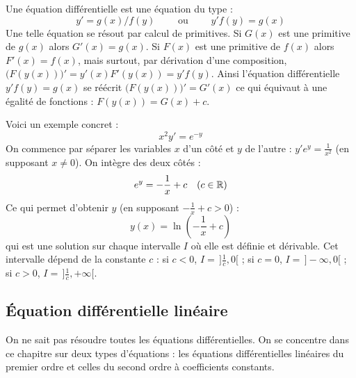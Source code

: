 \documentclass[class=report,crop=false]{standalone}
\begin{document}
\begin{exemple}
Une équation différentielle 
est une équation
du type :
$$y'=g(x)/f(y) \qquad \text{ ou } \qquad y'f(y)=g(x)$$
Une telle équation se résout par calcul de primitives.
Si $G(x)$ est une primitive de $g(x)$ alors $G'(x)=g(x)$.
Si $F(x)$ est une primitive de $f(x)$ alors
$F'(x)=f(x)$, mais surtout, par dérivation d'une composition,
$\big(F(y(x))\big)' = y'(x) F'(y(x)) = y' f(y)$.
Ainsi l'équation différentielle $y'f(y)=g(x)$
se réécrit $\big(F(y(x))\big)' = G'(x)$
ce qui équivaut à une égalité de fonctions :
$F(y(x))=G(x)+c$.

\bigskip

Voici un exemple concret :
$$x^2y' = e^{-y}$$
On commence par séparer les variables $x$ d'un côté et $y$ de l'autre :
$y'e^{y} = \frac{1}{x^2}$  (en supposant $x\neq 0$).
On intègre des deux côtés :
$$e^{y} = -\frac{1}{x}+c \quad (c\in\mathbb{R})$$
Ce qui permet d'obtenir $y$ (en supposant $-\frac{1}{x}+c>0$) :
$$y(x) = \ln\left(-\frac{1}{x}+c\right)$$
qui est une solution sur chaque intervalle $I$ où elle est définie et dérivable.
Cet intervalle dépend de la constante $c$ :
si $c<0$, $I=\,]\frac1c,0[$ ;
si $c=0$, $I=\,]-\infty,0[$ ; si $c>0$, $I=\,]\frac1c,+\infty[$.

\end{exemple}




\subsection{Équation différentielle linéaire}

On ne sait pas résoudre toutes les équations différentielles.
On se concentre dans ce chapitre sur deux types d'équations : les équations différentielles
linéaires du premier ordre et celles du second ordre à coefficients constants.
\end{document}
